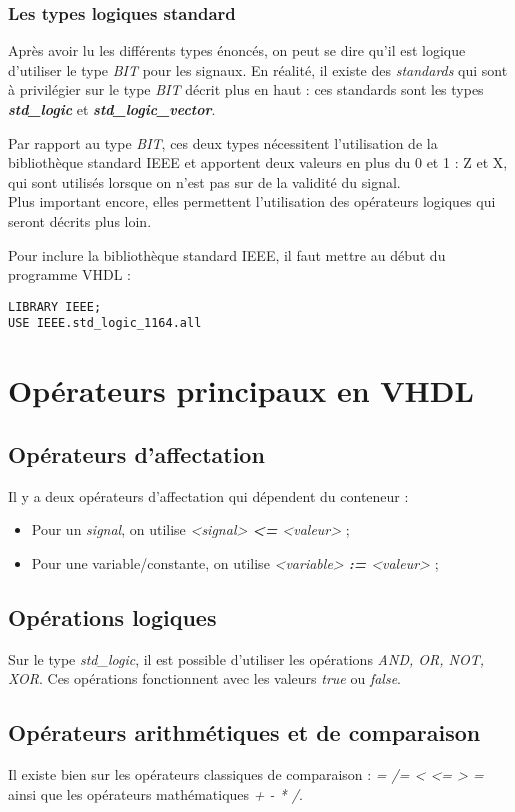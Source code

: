 \documentclass[11.5pt]{report}
\begin{document}
\subsubsection{Les types logiques standard}
Après avoir lu les différents types énoncés, on peut se dire qu'il est logique d'utiliser le type \emph{BIT} pour les signaux.
En réalité, il existe des \emph{standards} qui sont à privilégier sur le type \emph{BIT} décrit plus en haut : ces standards sont les types \textbf{\emph{std\_logic}} et \textbf{\emph{std\_logic\_vector}}.
\par
Par rapport au type \emph{BIT}, ces deux types nécessitent l'utilisation de la bibliothèque standard IEEE et apportent deux valeurs en plus du 0 et 1 : Z et X, qui sont utilisés lorsque on n'est pas sur de la validité du signal.\\
Plus important encore, elles permettent l'utilisation des opérateurs logiques qui seront décrits plus loin.
\par
Pour inclure la bibliothèque standard IEEE, il faut mettre au début du programme VHDL :
\begin{verbatim}
LIBRARY IEEE;
USE IEEE.std_logic_1164.all
\end{verbatim}

\section{Opérateurs principaux en VHDL}
\subsection{Opérateurs d'affectation}
Il y a deux opérateurs d'affectation qui dépendent du conteneur :
\begin{itemize}
\item{Pour un \emph{signal}, on utilise \emph{<signal> \textbf{<=} <valeur>} ;}
\item{Pour une variable/constante, on utilise \emph{<variable> \textbf{:=} <valeur>} ;}
\end{itemize}

\subsection{Opérations logiques}
Sur le type \emph{std\_logic}, il est possible d'utiliser les opérations \emph{AND, OR, NOT, XOR}.
Ces opérations fonctionnent avec les valeurs \emph{true} ou \emph{false}.

\subsection{Opérateurs arithmétiques et de comparaison}
Il existe bien sur les opérateurs classiques de comparaison : \emph{= /= < <= > =} ainsi que les opérateurs mathématiques \emph{+ - * /}.
 
\end{document}
